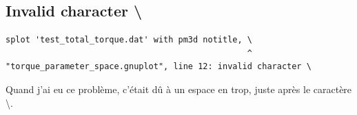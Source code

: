 \documentclass[a4paper,twoside]{article}
\begin{document}
\subsection{Invalid character \textbackslash}
\begin{verbatim}
splot 'test_total_torque.dat' with pm3d notitle, \ 
                                                 ^
"torque_parameter_space.gnuplot", line 12: invalid character \
\end{verbatim}

Quand j'ai eu ce problème, c'était dû à un espace en trop, juste après le caractère \og \textbackslash\fg.



\printindex
\end{document}
